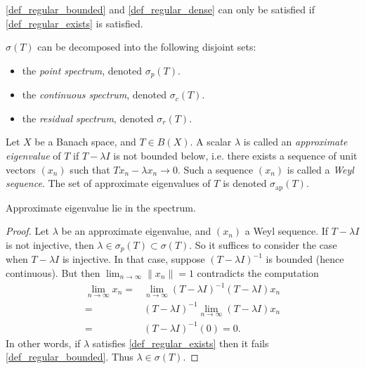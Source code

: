 \documentclass[12pt]{article}
\begin{document}
\begin{remark}
	\ref{def_regular_bounded} and \ref{def_regular_dense} can only be satisfied if \ref{def_regular_exists} is satisfied.
\end{remark}

\begin{definition}
	$\sigma(T)$ can be decomposed into the following disjoint sets:
	\begin{itemize}
		\item the \emph{point spectrum}, denoted $\sigma_p(T)$.
		\item the \emph{continuous spectrum}, denoted $\sigma_c(T)$.
		\item the \emph{residual spectrum}, denoted $\sigma_r(T)$.
	\end{itemize}
\end{definition}

\begin{definition} %
	Let $X$ be a Banach space, and $T\in B(X)$. A scalar $\lambda$ is called an \emph{approximate eigenvalue} of $T$ if $T-\lambda I$ is not bounded below, i.e. there exists a sequence of unit vectors $(x_n)$ such that $Tx_n-\lambda x_n \to 0$. Such a sequence $(x_n)$ is called a \emph{Weyl sequence}. The set of approximate eigenvalues of $T$ is denoted $\sigma_{\text{ap}}(T)$.
\end{definition}

\begin{proposition}
	Approximate eigenvalue lie in the spectrum. 
\end{proposition}
\begin{proof}
	Let $\lambda$ be an approximate eigenvalue, and $(x_n)$ a Weyl sequence. If $T-\lambda I$ is not injective, then $\lambda\in\sigma_p(T)\subset\sigma(T)$. So it suffices to consider the case when $T-\lambda I$ is injective. In that case, suppose $(T-\lambda I)^{-1}$ is bounded (hence continuous). But then $\lim_{n\to\infty} \|x_n\| = 1$ contradicts the computation
	\begin{align*}
		\lim_{n\to\infty} x_n 
		=& \lim_{n\to\infty} (T-\lambda I)^{-1}(T-\lambda I)x_n \\
		=& (T-\lambda I)^{-1}\lim_{n\to\infty} (T-\lambda I)x_n \\
		=& (T - \lambda I)^{-1} (0) = 0.
	\end{align*}
	In other words, if $\lambda$ satisfies \ref{def_regular_exists} then it fails \ref{def_regular_bounded}. Thus $\lambda\in\sigma(T)$.
\end{proof}
\end{document}
